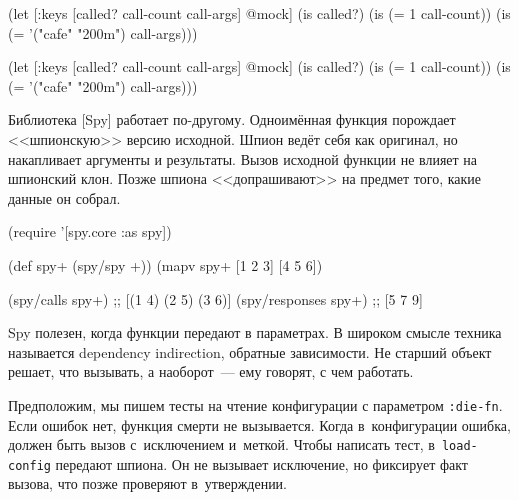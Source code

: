 \ifx\devicetype\mobile

\begin{english}
  \begin{clojure}
(let [{:keys [called?
              call-count
              call-args]} @mock]
  (is called?)
  (is (= 1 call-count))
  (is (= '("cafe" "200m") call-args)))
  \end{clojure}
\end{english}

\else

\begin{english}
  \begin{clojure}
(let [{:keys [called? call-count call-args]} @mock]
  (is called?)
  (is (= 1 call-count))
  (is (= '("cafe" "200m") call-args)))
  \end{clojure}
\end{english}

\fi


Библиотека [Spy] работает
по-другому. Одноимённая функция порождает <<шпионскую>> версию исходной. Шпион
ведёт себя как оригинал, но накапливает аргументы и результаты. Вызов исходной
функции не влияет на шпионский клон. Позже шпиона <<допрашивают>> на предмет
того, какие данные он собрал.

\begin{english}
  \begin{clojure}
(require '[spy.core :as spy])

(def spy+ (spy/spy +))
(mapv spy+ [1 2 3] [4 5 6])

(spy/calls spy+)
;; [(1 4) (2 5) (3 6)]
(spy/responses spy+)
;; [5 7 9]
  \end{clojure}
\end{english}



Spy полезен, когда функции передают в параметрах. В широком смысле техника
называется dependency indirection, обратные зависимости. Не старший объект
решает, что вызывать, а наоборот~--- ему говорят, с чем работать.

Предположим, мы пишем тесты на чтение конфигурации с параметром
\verb|:die-fn|. Если ошибок нет, функция смерти не вызывается. Когда
в~конфигурации ошибка, должен быть вызов с~исключением и~меткой. Чтобы написать
тест, в~\verb|load-config| передают шпиона. Он не вызывает исключение, но
фиксирует факт вызова, что позже проверяют в~утверждении.

